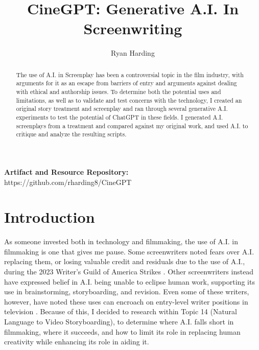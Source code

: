 \documentclass[sigconf]{acmart}
\begin{document}
\title{CineGPT: Generative A.I. In Screenwriting}


\author{Ryan Harding}

\begin{abstract}
The use of A.I. in Screenplay has been a controversial topic in the film industry, with arguments for it as an escape from barriers of entry and arguments against dealing with ethical and authorship issues. To determine both the potential uses and limitations, as well as to validate and test concerns with the technology, I created an original story treatment and screenplay and ran through several generative A.I. experiments to test the potential of ChatGPT in these fields. I generated A.I. screenplays from a treatment and compared against my original work, and used A.I. to critique and analyze the resulting scripts.
\end{abstract}

\maketitle

\textbf{Artifact and Resource Repository:}\\
https://github.com/rharding8/CineGPT

\section{Introduction}
\indent As someone invested both in technology and filmmaking, the use of A.I. in filmmaking is one that gives me pause. Some screenwriters noted fears over A.I. replacing them, or losing valuable credit and residuals due to the use of A.I., during the 2023 Writer's Guild of America Strikes \cite{Kinder_2024}. Other screenwriters instead have expressed belief in A.I. being unable to eclipse human work, supporting its use in brainstorming, storyboarding, and revision. Even some of these writers, however, have noted these uses can encroach on entry-level writer positions in television \cite{Deese_2024}. Because of this, I decided to research within Topic 14 (Natural Language to Video Storyboarding), to determine where A.I. falls short in filmmaking, where it succeeds, and how to limit its role in replacing human creativity while enhancing its role in aiding it.
\end{document}
